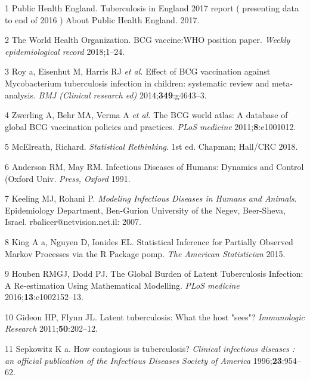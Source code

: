 \documentclass[11pt,twoside]{bristolthesis}
\begin{document}
  \hypertarget{refs}{}
  \leavevmode\hypertarget{ref-PHE2017}{}%
  1 Public Health England. Tuberculosis in England 2017 report ( presenting data to end of 2016 ) About Public Health England. 2017.
  
  \leavevmode\hypertarget{ref-TheWorldHealthOrganization:2018va}{}%
  2 The World Health Organization. BCG vaccine:WHO position paper. \emph{Weekly epidemiological record} 2018;1--24.
  
  \leavevmode\hypertarget{ref-Roy2014}{}%
  3 Roy a, Eisenhut M, Harris RJ \emph{et al.} Effect of BCG vaccination against Mycobacterium tuberculosis infection in children: systematic review and meta-analysis. \emph{BMJ (Clinical research ed)} 2014;\textbf{349}:g4643--3.
  
  \leavevmode\hypertarget{ref-Zwerling2011a}{}%
  4 Zwerling A, Behr MA, Verma A \emph{et al.} The BCG world atlas: A database of global BCG vaccination policies and practices. \emph{PLoS medicine} 2011;\textbf{8}:e1001012.
  
  \leavevmode\hypertarget{ref-McElreath:2018j}{}%
  5 McElreath, Richard. \emph{Statistical Rethinking}. 1st ed. Chapman; Hall/CRC 2018.
  
  \leavevmode\hypertarget{ref-Anderson1991}{}%
  6 Anderson RM, May RM. Infectious Diseases of Humans: Dynamics and Control (Oxford Univ. \emph{Press, Oxford} 1991.
  
  \leavevmode\hypertarget{ref-Keeling2007}{}%
  7 Keeling MJ, Rohani P. \emph{Modeling Infectious Diseases in Humans and Animals}. Epidemiology Department, Ben-Gurion University of the Negev, Beer-Sheva, Israel. rbalicer@netvision.net.il: 2007.
  
  \leavevmode\hypertarget{ref-King}{}%
  8 King A a, Nguyen D, Ionides EL. Statistical Inference for Partially Observed Markov Processes via the R Package pomp. \emph{The American Statistician} 2015.
  
  \leavevmode\hypertarget{ref-Houben:2016jp}{}%
  9 Houben RMGJ, Dodd PJ. The Global Burden of Latent Tuberculosis Infection: A Re-estimation Using Mathematical Modelling. \emph{PLoS medicine} 2016;\textbf{13}:e1002152--13.
  
  \leavevmode\hypertarget{ref-Gideon2011a}{}%
  10 Gideon HP, Flynn JL. Latent tuberculosis: What the host "sees"? \emph{Immunologic Research} 2011;\textbf{50}:202--12.
  
  \leavevmode\hypertarget{ref-Sepkowitz1996}{}%
  11 Sepkowitz K a. How contagious is tuberculosis? \emph{Clinical infectious diseases : an official publication of the Infectious Diseases Society of America} 1996;\textbf{23}:954--62.
  
\end{document}
